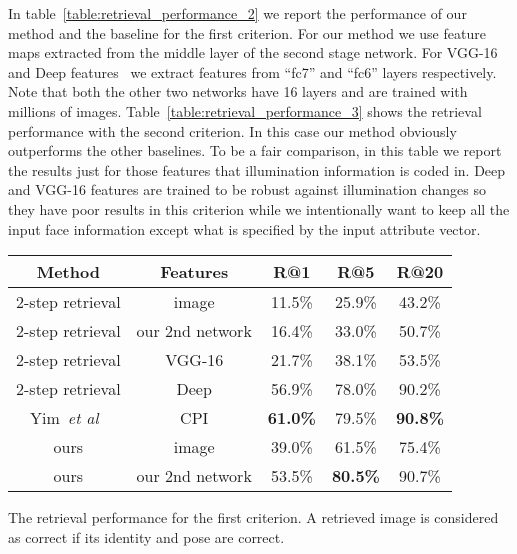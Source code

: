 \documentclass[10pt,twocolumn,letterpaper]{article}
\def\etal{\emph{et al}\onedot}
\begin{document}
In table~\ref{table:retrieval_performance_2} we report the performance of our method and the baseline for the first criterion. For our method we use feature maps extracted from the middle layer of the second stage network.
For VGG-16~\cite{Simonyan-iclr15} and Deep features~\cite{Parkhi-bmvc15} we extract features from ``fc7'' and ``fc6'' layers respectively. Note that both the other two networks have 16 layers and are trained with millions of images.
Table~\ref{table:retrieval_performance_3} shows the retrieval performance with the second criterion. In this case our method obviously outperforms the other baselines.
To be a fair comparison, in this table we report the results just for those features that illumination information is coded in. Deep and VGG-16 features are trained to be robust against illumination changes so they have poor results in this criterion while we intentionally want to keep all the input face information except what is specified by the input attribute vector.
\begin{center}{\small
{
\begin{tabular}{|c|c|c|c|c|}
\hline
Method & Features & R@1 & R@5 & R@20\\
\hline\hline
{2-step retrieval}	& image		& 11.5\% & 25.9\% & 43.2\% \\
{2-step retrieval}	& our 2nd network	& 16.4\% & 33.0\% & 50.7\% \\
{2-step retrieval}	& VGG-16	& 21.7\% & 38.1\% & 53.5\% \\
{2-step retrieval}	& Deep		& 56.9\% & 78.0\% & 90.2\% \\
\hline
Yim~\etal~\cite{Yim-cvpr15} & CPI 	& \bf{61.0}\% & 79.5\% & \bf{90.8}\% \\
\hline
{ours}			& image		& 39.0\% & 61.5\% & 75.4\% \\
{ours}			& our 2nd network	& 53.5\% & \bf{80.5}\% & 90.7\% \\
\hline
\end{tabular}
}
}
\end{center}
\caption{The retrieval performance for the first criterion. A retrieved image is considered as correct if its identity and pose are correct.}
\label{table:retrieval_performance_2}
\end{document}
